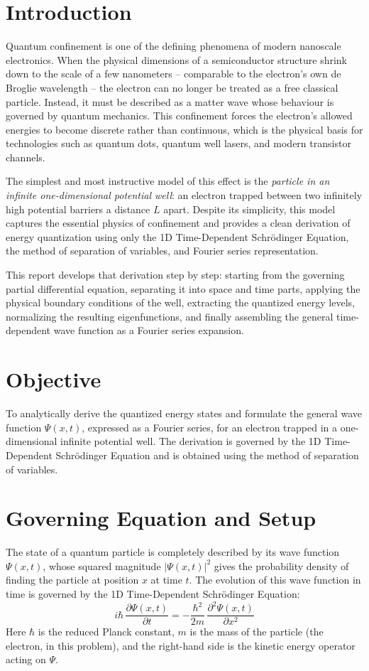 \documentclass[12pt, a4paper]{article}
\begin{document}
\section{Introduction}
Quantum confinement is one of the defining phenomena of modern nanoscale
electronics. When the physical dimensions of a semiconductor structure
shrink down to the scale of a few nanometers -- comparable to the
electron's own de Broglie wavelength -- the electron can no longer be
treated as a free classical particle. Instead, it must be described as
a matter wave whose behaviour is governed by quantum mechanics. This
confinement forces the electron's allowed energies to become discrete
rather than continuous, which is the physical basis for technologies
such as quantum dots, quantum well lasers, and modern transistor
channels.

The simplest and most instructive model of this effect is the
\emph{particle in an infinite one-dimensional potential well}: an
electron trapped between two infinitely high potential barriers a
distance $L$ apart. Despite its simplicity, this model captures the
essential physics of confinement and provides a clean derivation of
energy quantization using only the 1D Time-Dependent Schr\"odinger
Equation, the method of separation of variables, and Fourier series
representation.

This report develops that derivation step by step: starting from the
governing partial differential equation, separating it into space and
time parts, applying the physical boundary conditions of the well,
extracting the quantized energy levels, normalizing the resulting
eigenfunctions, and finally assembling the general time-dependent wave
function as a Fourier series expansion.

\section{Objective}
To analytically derive the quantized energy states and formulate the
general wave function $\Psi(x,t)$, expressed as a Fourier series, for an
electron trapped in a one-dimensional infinite potential well. The
derivation is governed by the 1D Time-Dependent Schr\"odinger Equation
and is obtained using the method of separation of variables.

\section{Governing Equation and Setup}
The state of a quantum particle is completely described by its wave
function $\Psi(x,t)$, whose squared magnitude $|\Psi(x,t)|^2$ gives the
probability density of finding the particle at position $x$ at time
$t$. The evolution of this wave function in time is governed by the
1D Time-Dependent Schr\"odinger Equation:
\begin{equation}
    i\hbar \, \frac{\partial \Psi(x,t)}{\partial t}
    = -\frac{\hbar^2}{2m} \, \frac{\partial^2 \Psi(x,t)}{\partial x^2}
    \label{eq:schrodinger}
\end{equation}
Here $\hbar$ is the reduced Planck constant, $m$ is the mass of the
particle (the electron, in this problem), and the right-hand side is
the kinetic energy operator acting on $\Psi$.
\end{document}
